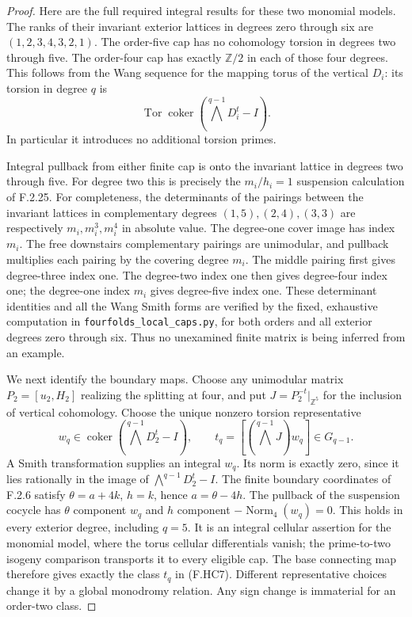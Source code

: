 \begin{proof}
Here are the full required integral results for these
two monomial models.
The ranks of their invariant exterior lattices in
degrees zero through six are
$(1,2,3,4,3,2,1)$.
The order-five cap has no cohomology torsion in degrees
two through five.
The order-four cap has exactly $\mathbb Z/2$ in each
of those four degrees.
This follows from the Wang sequence for the mapping
torus of the vertical $D_i$:
its torsion in degree $q$ is
\[
 \operatorname{Tor}\operatorname{coker}
       (\bigwedge^{q-1}D_i^t-I).
 \tag{F.HC6}
\]
In particular it introduces no additional torsion primes.

Integral pullback from either finite cap is onto the
invariant lattice in degrees two through five.
For degree two this is precisely the $m_i/h_i=1$
suspension calculation of F.2.25.
For completeness, the determinants of the pairings between
the invariant lattices in complementary degrees
$(1,5),(2,4),(3,3)$ are respectively
$m_i,m_i^3,m_i^4$ in absolute value.
The degree-one cover image has index $m_i$.
The free downstairs complementary pairings are unimodular,
and pullback multiplies each pairing by the covering
degree $m_i$.
The middle pairing first gives degree-three index one.
The degree-two index one then gives degree-four index one;
the degree-one index $m_i$ gives degree-five index one.
These determinant identities and all the Wang Smith
forms are verified by the fixed, exhaustive computation
in \texttt{fourfolds\_local\_caps.py}, for both orders and
all exterior degrees zero through six.
Thus no unexamined finite matrix is being inferred from
an example.

We next identify the boundary maps.
Choose any unimodular matrix $P_2=[u_2,H_2]$ realizing
the splitting at four, and put
$J=P_2^{-t}|_{\mathbb Z^5}$ for the inclusion of vertical
cohomology.
Choose the unique nonzero torsion representative
\[
 w_q\in\operatorname{coker}
            (\bigwedge^{q-1}D_2^t-I),\qquad
 t_q=[(\bigwedge^{q-1}J)w_q]\in G_{q-1}.
 \tag{F.HC7}
\]
A Smith transformation supplies an integral $w_q$.
Its norm is exactly zero, since it lies rationally in
the image of $\bigwedge^{q-1}D_2^t-I$.
The finite boundary coordinates of F.2.6 satisfy
$\theta=a+4k$, $h=k$, hence $a=\theta-4h$.
The pullback of the suspension cocycle has $\theta$
component $w_q$ and $h$ component
$-\operatorname{Norm}_4(w_q)=0$.
This holds in every exterior degree, including $q=5$.
It is an integral cellular assertion for the monomial
model, where the torus cellular differentials vanish;
the prime-to-two isogeny comparison transports it to
every eligible cap.
The base connecting map therefore gives exactly the
class $t_q$ in (F.HC7).
Different representative choices change it by a global
monodromy relation.  Any sign change is immaterial for
an order-two class.


\end{proof}
